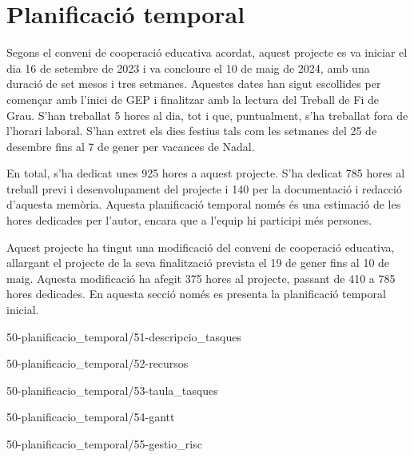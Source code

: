 \chapter{Planificació temporal}

Segons el conveni de cooperació educativa acordat, aquest projecte es va iniciar el dia 16 de setembre de 2023 i va concloure el 10 de maig de 2024, amb una duració de set mesos i tres setmanes. Aquestes dates han sigut escollides per començar amb l'inici de GEP i finalitzar amb la lectura del Treball de Fi de Grau. S'han treballat 5 hores al dia, tot i que, puntualment, s'ha treballat fora de l'horari laboral. S'han extret els dies festius tals com les setmanes del 25 de desembre fins al 7 de gener per vacances de Nadal.

En total, s'ha dedicat unes 925 hores a aquest projecte. S'ha dedicat 785 hores al treball previ i desenvolupament del projecte i 140 per la documentació i redacció d'aquesta memòria. Aquesta planificació temporal només és una estimació de les hores dedicades per l'autor, encara que a l'equip hi participi més persones.

Aquest projecte ha tingut una modificació del conveni de cooperació educativa, allargant el projecte de la seva finalització prevista el 19 de gener fins al 10 de maig. Aquesta modificació ha afegit 375 hores al projecte, passant de 410 a 785 hores dedicades. En aquesta secció només es presenta la planificació temporal inicial.

{50-planificacio_temporal/51-descripcio_tasques}

{50-planificacio_temporal/52-recursos}

{50-planificacio_temporal/53-taula_tasques}

{50-planificacio_temporal/54-gantt}

{50-planificacio_temporal/55-gestio_risc}

